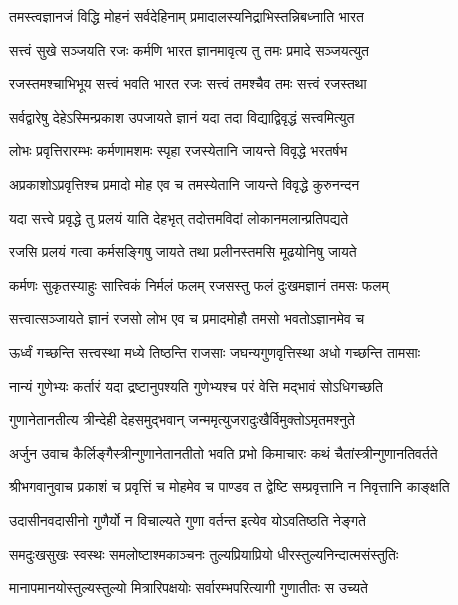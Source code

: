 \twolineshloka
{तमस्त्वज्ञानजं विद्धि मोहनं सर्वदेहिनाम्}
{प्रमादालस्यनिद्राभिस्तन्निबध्नाति भारत}%

\twolineshloka
{सत्त्वं सुखे सञ्जयति रजः कर्मणि भारत}
{ज्ञानमावृत्य तु तमः प्रमादे सञ्जयत्युत}%

\twolineshloka
{रजस्तमश्चाभिभूय सत्त्वं भवति भारत}
{रजः सत्त्वं तमश्चैव तमः सत्त्वं रजस्तथा}%

\twolineshloka
{सर्वद्वारेषु देहेऽस्मिन्प्रकाश उपजायते}
{ज्ञानं यदा तदा विद्याद्विवृद्धं सत्त्वमित्युत}%

\twolineshloka
{लोभः प्रवृत्तिरारम्भः कर्मणामशमः स्पृहा}
{रजस्येतानि जायन्ते विवृद्धे भरतर्षभ}%

\twolineshloka
{अप्रकाशोऽप्रवृत्तिश्च प्रमादो मोह एव च}
{तमस्येतानि जायन्ते विवृद्धे कुरुनन्दन}%

\twolineshloka
{यदा सत्त्वे प्रवृद्धे तु प्रलयं याति देहभृत्}
{तदोत्तमविदां लोकानमलान्प्रतिपद्यते}%

\twolineshloka
{रजसि प्रलयं गत्वा कर्मसङ्गिषु जायते}
{तथा प्रलीनस्तमसि मूढयोनिषु जायते}%

\twolineshloka
{कर्मणः सुकृतस्याहुः सात्त्विकं निर्मलं फलम्}
{रजसस्तु फलं दुःखमज्ञानं तमसः फलम्}%

\twolineshloka
{सत्त्वात्सञ्जायते ज्ञानं रजसो लोभ एव च}
{प्रमादमोहौ तमसो भवतोऽज्ञानमेव च}%

\twolineshloka
{ऊर्ध्वं गच्छन्ति सत्त्वस्था मध्ये तिष्ठन्ति राजसाः}
{जघन्यगुणवृत्तिस्था अधो गच्छन्ति तामसाः}%

\twolineshloka
{नान्यं गुणेभ्यः कर्तारं यदा द्रष्टानुपश्यति}
{गुणेभ्यश्च परं वेत्ति मद्भावं सोऽधिगच्छति}%

\twolineshloka
{गुणानेतानतीत्य त्रीन्देही देहसमुद्भवान्}
{जन्ममृत्युजरादुःखैर्विमुक्तोऽमृतमश्नुते}%

{अर्जुन उवाच}
\twolineshloka
{कैर्लिङ्गैस्त्रीन्गुणानेतानतीतो भवति प्रभो}
{किमाचारः कथं चैतांस्त्रीन्गुणानतिवर्तते}%

{श्रीभगवानुवाच}
\twolineshloka
{प्रकाशं च प्रवृत्तिं च मोहमेव च पाण्डव}
{त द्वेष्टि सम्प्रवृत्तानि न निवृत्तानि काङ्क्षति}%

\twolineshloka
{उदासीनवदासीनो गुणैर्यो न विचाल्यते}
{गुणा वर्तन्त इत्येव योऽवतिष्ठति नेङ्गते}%

\twolineshloka
{समदुःखसुखः स्वस्थः समलोष्टाश्मकाञ्चनः}
{तुल्यप्रियाप्रियो धीरस्तुल्यनिन्दात्मसंस्तुतिः}%

\twolineshloka
{मानापमानयोस्तुल्यस्तुल्यो मित्रारिपक्षयोः}
{सर्वारम्भपरित्यागी गुणातीतः स उच्यते}%

